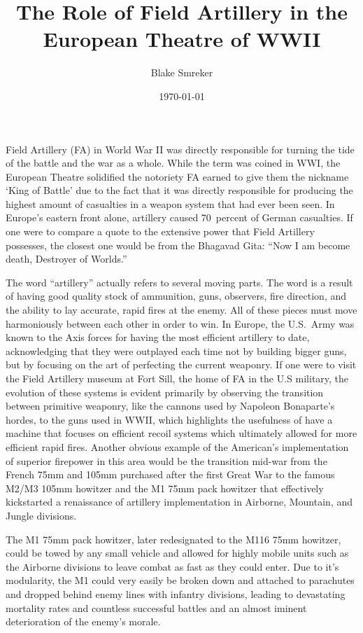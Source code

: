 \documentclass{article}
\title{The Role of Field Artillery in the European Theatre of WWII}
\author{Blake Smreker}
\date{\today}
\begin{document}
\maketitle

Field Artillery (FA) in World War II was directly responsible for turning the tide of the battle and the war as a whole.
While the term was coined in WWI, the European Theatre solidified the notoriety FA earned to give them the nickname
`King of Battle' due to the fact that it was directly responsible for producing the highest amount of casualties in a
weapon system that had ever been seen. In Europe's eastern front alone, artillery caused 70~percent of German
casualties. If one were to compare a quote to the extensive power that Field Artillery possesses, the closest one would be
from the Bhagavad Gita: ``Now I am become death, Destroyer of Worlds.''

The word ``artillery'' actually refers to several moving parts. The word is a result of having good quality stock of
ammunition, guns, observers, fire direction, and the ability to lay accurate, rapid fires at the enemy. All of these pieces
must move harmoniously between each other in order to win. In Europe, the U.S.\ Army was known to the Axis forces for having
the most efficient artillery to date, acknowledging that they were outplayed each time not by building bigger guns, but by
focusing on the art of perfecting the current weaponry. If one were to visit the Field Artillery museum at Fort Sill, the
home of FA in the U.S military, the evolution of these systems is evident primarily by observing the transition between
primitive weaponry, like the cannons used by Napoleon Bonaparte's hordes, to the guns used in WWII, which highlights the
usefulness of have a machine that focuses on efficient recoil systems which ultimately allowed for more efficient rapid fires.
Another obvious example of the American's implementation of superior firepower in this area would be the transition mid-war
from the French 75mm and 105mm purchased after the first Great War to the famous M2/M3 105mm howitzer and the M1 75mm pack howitzer
that effectively kickstarted a renaissance of artillery implementation in Airborne, Mountain, and Jungle divisions.

The M1 75mm pack howitzer, later redesignated to the M116 75mm howitzer, could be towed by any small vehicle and allowed for
highly mobile units such as the Airborne divisions to leave combat as fast as they could enter. Due to it's modularity, the M1
could very easily be broken down and attached to parachutes and dropped behind enemy lines with infantry divisions, leading to
devastating mortality rates and countless successful battles and an almost iminent deterioration of the enemy's morale. 
\end{document}
